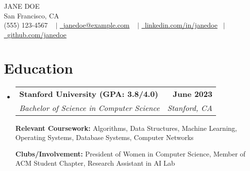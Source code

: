 \documentclass[letterpaper,11pt]{article}
\makeatletter
\newcommand{\resumeSubheading}[4]{
  \vspace{-2pt}\item
    \begin{tabular*}{1.0\textwidth}[t]{l@{\extracolsep{\fill}}r}
      \textbf{#1} & \textbf{\small #2} \\
      \textit{\small#3} & \textit{\small #4} \\
    \end{tabular*}\vspace{-7pt}
}
\newcommand{\resumeSubHeadingListStart}{\begin{itemize}[leftmargin=0.0in, label={}]}
\newcommand{\resumeSubHeadingListEnd}{\end{itemize}}
\makeatother
\begin{document}


\begin{center}
    {\Huge \scshape  JANE DOE  } \\ \vspace{1pt}
                \vspace{-1pt}
    San Francisco, CA \\ \vspace{0pt}
            \vspace{0pt}
    \small \raisebox{-0.1\height} (555) 123-4567 ~ $\vert$ \href{mailto:janedoe@example.com}{\raisebox{-0.2\height}\ \underline{janedoe@example.com}} ~ $\vert$
        \vspace{4pt}
    \href{https://linkedin.com/in/janedoe}{\raisebox{-0.2\height}\ \underline{linkedin.com/in/janedoe}}  ~$\vert$
    \href{https://github.com/janedoe}{\raisebox{-0.2\height}\ \underline{github.com/janedoe}}

    \vspace{-14pt}
\end{center}


\section{Education}
  \resumeSubHeadingListStart
    \resumeSubheading
      {Stanford University (GPA: 3.8/4.0)}{June 2023}
      {Bachelor of Science in Computer Science}{Stanford, CA}
          \vspace{-2pt}

    {\textbf{Relevant Coursework:}  Algorithms, Data Structures, Machine Learning, Operating Systems, Database Systems, Computer Networks}
          \vspace{-2pt}

    {\textbf{Clubs/Involvement:} President of Women in Computer Science, Member of ACM Student Chapter, Research Assistant in AI Lab}

  \resumeSubHeadingListEnd

\end{document}
